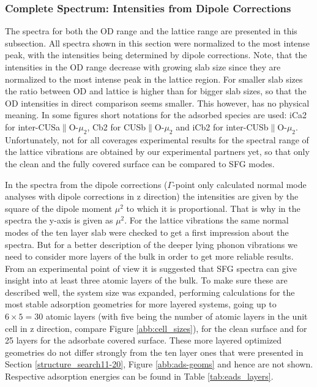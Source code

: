 \documentclass[11pt,DIV=13,BCOR=5mm,a4paper,headinclude]{scrbook}
\newcommand\todo[1]{\textcolor{red}{TODO: \textit{{#1}}}}
\begin{document}
\subsubsection{Complete Spectrum: Intensities from Dipole Corrections}\label{phonons}

The spectra for both the OD range and the lattice range are presented in this subsection.
All spectra shown in this section were normalized to the most intense peak, with the intensities being determined by dipole corrections.
Note, that the intensities in the OD range decrease with growing slab size since they are normalized to the most intense peak in the lattice region.
For smaller slab sizes the ratio between OD and lattice is higher than for bigger slab sizes, so that the OD intensities in direct comparison seems smaller.
This however, has no physical meaning.
In some figures short notations for the adsorbed species are used: iCa2 for inter-CUSa$\parallel$O-$\mu_2$, Cb2 for CUSb$\parallel$O-$\mu_2$ and iCb2 for inter-CUSb$\parallel$O-$\mu_2$.
Unfortunately, not for all coverages experimental results for the spectral range of the lattice vibrations are obtained by our experimental partners yet, so that only the clean and the fully covered surface can be compared to SFG modes.


In the spectra from the dipole corrections ($\Gamma$-point only calculated normal mode analyses with dipole corrections in z direction) the intensities are given by the square of the dipole moment $\mu^2$ to which it is proportional.
That is why in the spectra the y-axis is given as $\mu^2$.
For the lattice vibrations the same normal modes of the ten layer slab were checked to get a first impression about the spectra.
But for a better description of the deeper lying phonon vibrations we need to consider more layers of the bulk in order to get more reliable results.
From an experimental point of view it is suggested that SFG spectra can give insight into at least three atomic layers of the bulk.
To make sure these are described well, the system size was expanded, performing calculations for the most stable adsorption geometries for more layered systems, going up to $6\times 5=30$ atomic layers (with five being the number of atomic layers in the unit cell in z direction, compare Figure \ref{abb:cell_sizes}), for the clean surface and for 25 layers for the adsorbate covered surface.
These more layered optimized geometries do not differ strongly from the ten layer ones that were presented in Section \ref{structure_search11-20}, Figure \ref{abb:ads-geoms} and hence are not shown.
Respective adsorption energies can be found in Table \ref{tab:eads_layers}.
\end{document}
